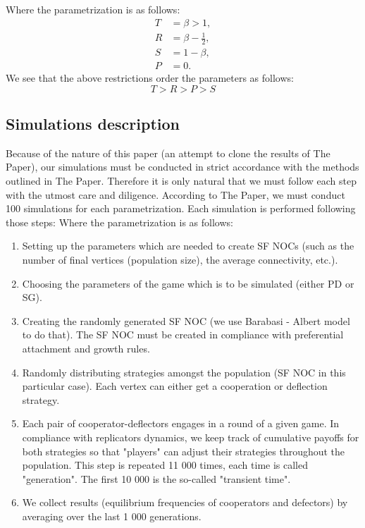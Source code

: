 \documentclass[english, twoside, 12pt, a4paper]{article}
\theoremstyle{definition}
\theoremstyle{plain}
\theoremstyle{remark}
\begin{document}
  Where the parametrization is as follows:
  \[
  \begin{aligned}
  T &= \beta > 1 ,\\
  R &= \beta - \frac{1}{2} ,\\
  S &= 1 - \beta ,\\
  P &= 0. 
  \end{aligned}
\]
We see that the above restrictions order the parameters as follows:
\[
 T > R > P > S 
\]

\subsection{Simulations description}

Because of the nature of this paper (an attempt to clone the results of The Paper), our simulations must be conducted in strict accordance with the methods outlined
in The Paper. Therefore it is only natural that we must follow each step with the utmost care and diligence. According to The Paper, we must conduct 100 simulations 
for each parametrization. Each simulation is performed following those steps: Where the parametrization is as follows:
\begin{enumerate}
  \item Setting up the parameters which are needed to create SF NOCs (such as the number of final vertices (population size), the average connectivity, etc.).
  \item Choosing the parameters of the game which is to be simulated (either PD or SG).
  \item Creating the randomly generated SF NOC (we use Barabasi - Albert model to do that). The SF NOC must be created in compliance with preferential attachment and 
  growth rules.
  \item Randomly distributing strategies amongst the population (SF NOC in this particular case). Each vertex can either get a cooperation or deflection strategy.
  \item Each pair of cooperator-deflectors engages in a round of a given game. In compliance with replicators dynamics, we keep track of cumulative payoffs for both 
  strategies so that "players" can adjust their strategies throughout the population. This step is repeated 11 000 times, each time is called "generation". The first 
  10 000 is the so-called "transient time".
  \item We collect results (equilibrium frequencies of cooperators and defectors) by averaging over the last 1 000 generations.
\end{enumerate}
\end{document}
